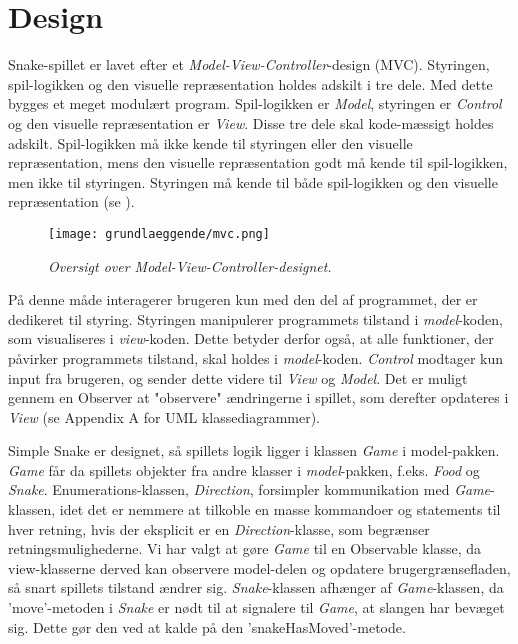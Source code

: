 \section{Design}
Snake-spillet er lavet efter et \textit{Model-View-Controller}-design (MVC). Styringen, spil-logikken og den visuelle repræsentation holdes adskilt i tre dele. Med dette bygges et meget modulært program. Spil-logikken er \textit{Model}, styringen er \textit{Control} og den visuelle repræsentation er \textit{View}. Disse tre dele skal kode-mæssigt holdes adskilt. Spil-logikken må ikke kende til styringen eller den visuelle repræsentation, mens den visuelle repræsentation godt må kende til spil-logikken, men ikke til styringen. Styringen må kende til både spil-logikken og den visuelle repræsentation (se ).
\newline

\begin{figure}[h]
	\centering
   	\texttt{[image: grundlaeggende/mvc.png]}

	\caption{\textit{Oversigt over Model-View-Controller-designet.}}
\end{figure}

På denne måde interagerer brugeren kun med den del af programmet, der er dedikeret til styring. Styringen manipulerer programmets tilstand i \textit{model}-koden, som visualiseres i \textit{view}-koden. Dette betyder derfor også, at alle funktioner, der påvirker programmets tilstand, skal holdes i \textit{model}-koden. \textit{Control} modtager kun input fra brugeren, og sender dette videre til \textit{View} og \textit{Model}. Det er muligt gennem en Observer at "observere" ændringerne i spillet, som derefter opdateres i \textit{View} (se Appendix A for UML klassediagrammer).
\newline

Simple Snake er designet, så spillets logik ligger i klassen \textit{Game} i model-pakken. \textit{Game} får da spillets objekter fra andre klasser i \textit{model}-pakken, f.eks. \textit{Food} og \textit{Snake}. Enumerations-klassen, \textit{Direction}, forsimpler kommunikation med \textit{Game}-klassen, idet det er nemmere at tilkoble en masse kommandoer og statements til hver retning, hvis der eksplicit er en \textit{Direction}-klasse, som begrænser retningsmulighederne. Vi har valgt at gøre \textit{Game} til en Observable klasse, da view-klasserne derved kan observere model-delen og opdatere brugergrænsefladen, så snart spillets tilstand ændrer sig. \textit{Snake}-klassen afhænger af \textit{Game}-klassen, da 'move'-metoden i \textit{Snake} er nødt til at signalere til \textit{Game}, at slangen har bevæget sig. Dette gør den ved at kalde på den 'snakeHasMoved'-metode.

